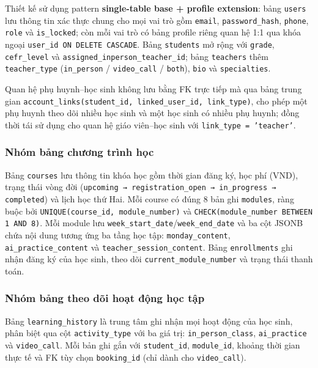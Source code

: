 Thiết kế sử dụng pattern \textbf{single-table base + profile extension}: bảng \texttt{users} lưu thông tin xác thực chung cho mọi vai trò gồm \texttt{email}, \texttt{password\_hash}, \texttt{phone}, \texttt{role} và \texttt{is\_locked}; còn mỗi vai trò có bảng profile riêng quan hệ 1:1 qua khóa ngoại \texttt{user\_id ON DELETE CASCADE}. Bảng \texttt{students} mở rộng với \texttt{grade}, \texttt{cefr\_level} và \texttt{assigned\_inperson\_teacher\_id}; bảng \texttt{teachers} thêm \texttt{teacher\_type} (\texttt{in\_person} / \texttt{video\_call} / \texttt{both}), \texttt{bio} và \texttt{specialties}.

Quan hệ phụ huynh--học sinh không lưu bằng FK trực tiếp mà qua bảng trung gian \texttt{account\_links(student\_id, linked\_user\_id, link\_type)}, cho phép một phụ huynh theo dõi nhiều học sinh và một học sinh có nhiều phụ huynh; đồng thời tái sử dụng cho quan hệ giáo viên--học sinh với \texttt{link\_type = 'teacher'}.

\subsubsection{Nhóm bảng chương trình học}

Bảng \texttt{courses} lưu thông tin khóa học gồm thời gian đăng ký, học phí (VND), trạng thái vòng đời (\texttt{upcoming → registration\_open → in\_progress → completed}) và lịch học thứ Hai. Mỗi course có đúng 8 bản ghi \texttt{modules}, ràng buộc bởi \texttt{UNIQUE(course\_id, module\_number)} và \texttt{CHECK(module\_number BETWEEN 1 AND 8)}. Mỗi module lưu \texttt{week\_start\_date}/\texttt{week\_end\_date} và ba cột JSONB chứa nội dung tương ứng ba tầng học tập: \texttt{monday\_content}, \texttt{ai\_practice\_content} và \texttt{teacher\_session\_content}. Bảng \texttt{enrollments} ghi nhận đăng ký của học sinh, theo dõi \texttt{current\_module\_number} và trạng thái thanh toán.

\subsubsection{Nhóm bảng theo dõi hoạt động học tập}

Bảng \texttt{learning\_history} là trung tâm ghi nhận mọi hoạt động của học sinh, phân biệt qua cột \texttt{activity\_type} với ba giá trị: \texttt{in\_person\_class}, \texttt{ai\_practice} và \texttt{video\_call}. Mỗi bản ghi gắn với \texttt{student\_id}, \texttt{module\_id}, khoảng thời gian thực tế và FK tùy chọn \texttt{booking\_id} (chỉ dành cho \texttt{video\_call}).

